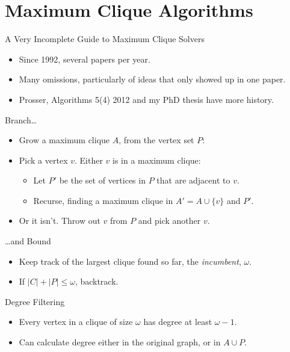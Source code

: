 \documentclass[aspectratio=169,compress,10pt]{beamer}
\begin{document}
\section{Maximum Clique Algorithms}

\begin{frame}{A Very Incomplete Guide to Maximum Clique Solvers}
    \begin{itemize}
        \item Since 1992, several papers per year.
        \item Many omissions, particularly of ideas that only showed up in one paper.
        \item Prosser, Algorithms 5(4) 2012 and my PhD thesis have more history.
    \end{itemize}
\end{frame}

\begin{frame}{Branch\ldots}
    \begin{itemize}
        \item Grow a maximum clique $A$, from the vertex set $P$:
        \item Pick a vertex $v$. Either $v$ is in a maximum clique:
            \begin{itemize}
                \item Let $P'$ be the set of vertices in $P$ that are adjacent to $v$.
                \item Recurse, finding a maximum clique in $A' = A \cup \{ v \}$ and $P'$.
            \end{itemize}
        \item Or it isn't. Throw out $v$ from $P$ and pick another $v$.
    \end{itemize}
\end{frame}

\begin{frame}{\ldots and Bound}
    \begin{itemize}
        \item Keep track of the largest clique found so far, the \emph{incumbent}, $\omega$.
        \item If $|C| + |P| \le \omega$, backtrack.
    \end{itemize}
\end{frame}

\begin{frame}{Degree Filtering}
    \begin{itemize}
        \item Every vertex in a clique of size $\omega$ has degree at least $\omega - 1$.
        \item Can calculate degree either in the original graph, or in $A \cup P$.
    \end{itemize}
\end{frame}
\end{document}
